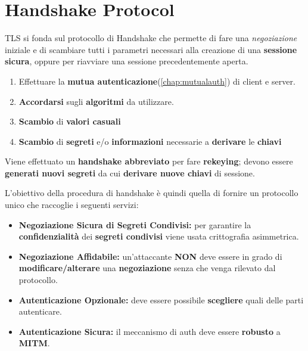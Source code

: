 \section{Handshake Protocol}
TLS si fonda sul protocollo di Handshake che permette di fare una \textit{negoziazione} iniziale e di scambiare tutti i parametri necessari alla creazione di una \textbf{sessione sicura}, oppure per riavviare una sessione precedentemente aperta.
\begin{proposition}
\noindent
\begin{enumerate}
    \item Effettuare la \textbf{mutua autenticazione}(\cref{chap:mutualauth}) di client e server.
    \item \textbf{Accordarsi} sugli \textbf{algoritmi} da utilizzare.
    \item \textbf{Scambio} di \textbf{valori casuali}
    \item \textbf{Scambio} di \textbf{segreti} e/o \textbf{informazioni} necessarie a \textbf{derivare} le \textbf{chiavi}
\end{enumerate}
\end{proposition}
\begin{proposition}
Viene effettuato un \textbf{handshake abbreviato} per fare \textbf{rekeying}; devono essere \textbf{generati nuovi segreti} da cui \textbf{derivare nuove chiavi} di sessione.
\end{proposition}
L'obiettivo della procedura di handshake è quindi quella di fornire un protocollo unico che raccoglie i seguenti servizi:
\begin{theorem}
\noindent
\begin{itemize}
    \item \textbf{Negoziazione Sicura di Segreti Condivisi:} per garantire la \textbf{confidenzialità} dei \textbf{segreti condivisi} viene usata crittografia asimmetrica.
    \item \textbf{Negoziazione Affidabile:} un'attaccante \textbf{NON} deve essere in grado di \textbf{modificare/alterare} una \textbf{negoziazione} senza che venga rilevato dal protocollo.
    \item \textbf{Autenticazione Opzionale:} deve essere possibile \textbf{scegliere} quali delle parti autenticare.
    \item \textbf{Autenticazione Sicura:} il meccanismo di auth deve essere \textbf{robusto} a \textbf{MITM}.
    \end{itemize}
\end{theorem}
